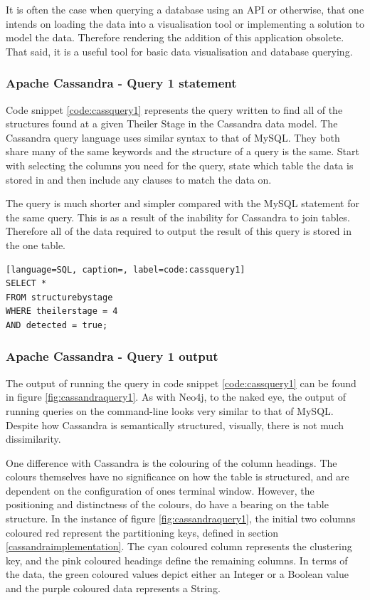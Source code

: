 It is often the case when querying a database using an API or otherwise, that one intends on loading the data into a visualisation tool or implementing a solution to model the data. Therefore rendering the addition of this application obsolete. That said, it is a useful tool for basic data visualisation and database querying.

\subsubsection*{Apache Cassandra - Query 1 statement}\label{cassquery1statement}
Code snippet \ref{code:cassquery1} represents the query written to find all of the structures found at a given Theiler Stage in the Cassandra data model. The Cassandra query language uses similar syntax to that of MySQL. They both share many of the same keywords and the structure of a query is the same. Start with selecting the columns you need for the query, state which table the data is stored in and then include any clauses to match the data on.

The query is much shorter and simpler compared with the MySQL statement for the same query. This is as a result of the inability for Cassandra to join tables. Therefore all of the data required to output the result of this query is stored in the one table.

\begin{lstlisting}[language=SQL, caption=, label=code:cassquery1]
SELECT *
FROM structurebystage
WHERE theilerstage = 4
AND detected = true;
\end{lstlisting}

\subsubsection*{Apache Cassandra - Query 1 output}\label{cassquery1output}
The output of running the query in code snippet \ref{code:cassquery1} can be found in figure \ref{fig:cassandraquery1}. As with Neo4j, to the naked eye, the output of running queries on the command-line looks very similar to that of MySQL. Despite how Cassandra is semantically structured, visually, there is not much dissimilarity.

One difference with Cassandra is the colouring of the column headings. The colours themselves have no significance on how the table is structured, and are dependent on the configuration of ones terminal window. However, the positioning and distinctness of the colours, do have a bearing on the table structure. In the instance of figure \ref{fig:cassandraquery1}, the initial two columns coloured red represent the partitioning keys, defined in section \ref{cassandraimplementation}. The cyan coloured column represents the clustering key, and the pink coloured headings define the remaining columns. In terms of the data, the green coloured values depict either an Integer or a Boolean value and the purple coloured data represents a String.

